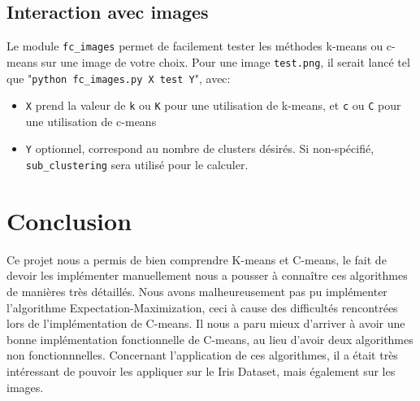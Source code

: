 \documentclass{article}
\begin{document}
    \subsection{Interaction avec images}
      Le module \texttt{fc\_images} permet de facilement tester les méthodes k-means ou c-means sur une image de votre choix. Pour une image \texttt{test.png}, il serait lancé tel que "\texttt{python fc\_images.py X test Y}", avec:

      \begin{itemize}
         \item \texttt{X} prend la valeur de \texttt{k} ou \texttt{K} pour une utilisation de k-means, et \texttt{c} ou \texttt{C} pour une utilisation de c-means
         \item \texttt{Y} optionnel, correspond au nombre de clusters désirés. Si non-spécifié, \texttt{sub\_clustering} sera utilisé pour le calculer.
      \end{itemize}

  \section{Conclusion}

  Ce projet nous a permis de bien comprendre K-means et C-means, le fait de devoir les implémenter
  manuellement nous a pousser à connaître ces algorithmes de manières très détaillés.
  Nous avons malheureusement pas pu implémenter l'algorithme Expectation-Maximization,
  ceci à cause des difficultés rencontrées lors de l'implémentation de C-means.
  Il nous a paru mieux d'arriver à avoir une bonne implémentation fonctionnelle de C-means,
  au lieu d'avoir deux algorithmes non fonctionnnelles.
  Concernant l'application de ces algorithmes,
  il a était très intéressant de pouvoir les appliquer sur le Iris Dataset, mais également sur les images.
\end{document}
